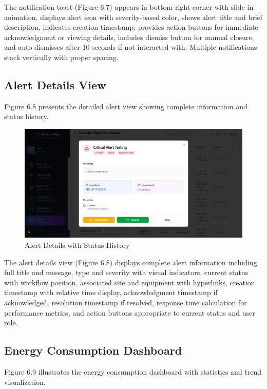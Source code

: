 The notification toast (Figure 6.7) appears in bottom-right corner with slide-in animation, displays alert icon with severity-based color, shows alert title and brief description, indicates creation timestamp, provides action buttons for immediate acknowledgment or viewing details, includes dismiss button for manual closure, and auto-dismisses after 10 seconds if not interacted with. Multiple notifications stack vertically with proper spacing.

\subsection{Alert Details View}

Figure 6.8 presents the detailed alert view showing complete information and status history.

\begin{figure}[H]
    \centering
    \includegraphics[width=0.85\linewidth]{img/chap_06/screenshot_alert_details.png}
    \caption{Alert Details with Status History}
    \label{fig:alert_details}
\end{figure}

The alert details view (Figure 6.8) displays complete alert information including full title and message, type and severity with visual indicators, current status with workflow position, associated site and equipment with hyperlinks, creation timestamp with relative time display, acknowledgment timestamp if acknowledged, resolution timestamp if resolved, response time calculation for performance metrics, and action buttons appropriate to current status and user role.

\subsection{Energy Consumption Dashboard}

Figure 6.9 illustrates the energy consumption dashboard with statistics and trend visualization.

